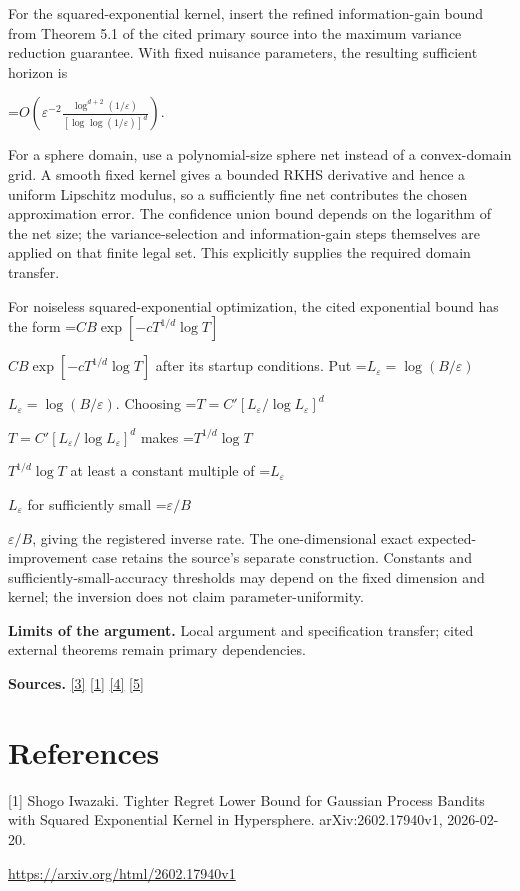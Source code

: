 \documentclass[10pt,a4paper]{article}
\newcommand{\AtlasMath}[1]{\par\begingroup\centering\setbox0=\hbox{$\displaystyle #1$}\ifdim\wd0>1.4\linewidth\typeout{ATLAS WIDE FORMULA: \the\wd0}\fi\ifdim\wd0>\linewidth\resizebox{\linewidth}{!}{\box0}\else\box0\fi\par\endgroup}
\newcommand{\AtlasInlineMath}[1]{\begingroup\setbox0=\hbox{$#1$}\ifdim\wd0>.4\linewidth\endgroup\AtlasMath{#1}\else\endgroup$#1$\fi}
\begin{document}
For the squared-exponential kernel, insert the refined information-gain bound from Theorem 5.1 of the cited primary source into the maximum variance reduction guarantee. With fixed nuisance parameters, the resulting sufficient horizon is

\AtlasMath{O\!\left(\varepsilon^{-2}\frac{\log^{d+2}(1/\varepsilon)}{[\log\log(1/\varepsilon)]^d}\right).}

For a sphere domain, use a polynomial-size sphere net instead of a convex-domain grid. A smooth fixed kernel gives a bounded RKHS derivative and hence a uniform Lipschitz modulus, so a sufficiently fine net contributes the chosen approximation error. The confidence union bound depends on the logarithm of the net size; the variance-selection and information-gain steps themselves are applied on that finite legal set. This explicitly supplies the required domain transfer.

For noiseless squared-exponential optimization, the cited exponential bound has the form \AtlasInlineMath{C B\exp[-cT^{1/d}\log T]} after its startup conditions. Put \AtlasInlineMath{L_\varepsilon=\log(B/\varepsilon)}. Choosing \AtlasInlineMath{T=C'[L_\varepsilon/\log L_\varepsilon]^d} makes \AtlasInlineMath{T^{1/d}\log T} at least a constant multiple of \AtlasInlineMath{L_\varepsilon} for sufficiently small \AtlasInlineMath{\varepsilon/B}, giving the registered inverse rate. The one-dimensional exact expected-improvement case retains the source's separate construction. Constants and sufficiently-small-accuracy thresholds may depend on the fixed dimension and kernel; the inversion does not claim parameter-uniformity.

\textbf{Limits of the argument.} Local argument and specification transfer; cited external theorems remain primary dependencies.

\textbf{Sources.} \href{https://proceedings.neurips.cc/paper/2021/file/b1300291698eadedb559786c809cc592-Paper.pdf}{[3]} \href{https://arxiv.org/html/2602.17940v1}{[1]} \href{https://arxiv.org/html/2502.06363v1}{[4]} \href{https://arxiv.org/html/2607.29245v2}{[5]}

\section{References}
[1] Shogo Iwazaki. Tighter Regret Lower Bound for Gaussian Process Bandits with Squared Exponential Kernel in Hypersphere. arXiv:2602.17940v1, 2026-02-20.

\url{https://arxiv.org/html/2602.17940v1}
\end{document}
